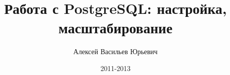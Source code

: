 \title{Работа с PostgreSQL: настройка, масштабирование}
\author{Алексей Васильев Юрьевич}
\date{2011-2013}
